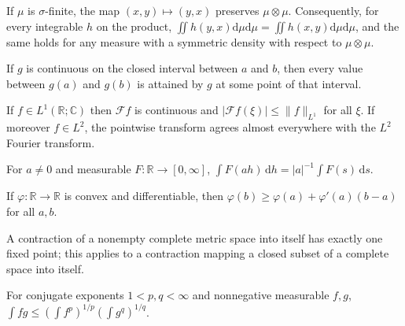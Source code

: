 \begin{theorem}\label{thm:std_product_swap}
\mathlibok
If $\mu$ is $\sigma$-finite, the map $(x, y) \mapsto (y, x)$ preserves $\mu \otimes \mu$. Consequently, for every integrable $h$ on the product, $\iint h(y, x) \mathrm{d}\mu \mathrm{d}\mu = \iint h(x, y) \mathrm{d}\mu \mathrm{d}\mu$, and the same holds for any measure with a symmetric density with respect to $\mu \otimes \mu$.
\end{theorem}

\begin{theorem}\label{thm:std_ivt}
\mathlibok
If $g$ is continuous on the closed interval between $a$ and $b$, then every value between $g(a)$ and $g(b)$ is attained by $g$ at some point of that interval.
\end{theorem}

\begin{theorem}\label{thm:std_fourier_L1}
\mathlibok
If $f \in L^1(\mathbb{R}; \mathbb{C})$ then $\mathcal{F} f$ is continuous and $\lvert \mathcal{F} f(\xi) \rvert \le \lVert f \rVert_{L^1}$ for all $\xi$. If moreover $f \in L^2$, the pointwise transform agrees almost everywhere with the $L^2$ Fourier transform.
\end{theorem}

\begin{theorem}\label{thm:std_line_scaling}
\mathlibok
For $a \ne 0$ and measurable $F : \mathbb{R} \to [0, \infty]$, $\int F(a h)\, \mathrm{d}h = \lvert a \rvert^{-1} \int F(s)\, \mathrm{d}s$.
\end{theorem}

\begin{theorem}\label{thm:std_convex_tangent}
\mathlibok
If $\varphi : \mathbb{R} \to \mathbb{R}$ is convex and differentiable, then $\varphi(b) \ge \varphi(a) + \varphi'(a)(b - a)$ for all $a, b$.
\end{theorem}

\begin{theorem}\label{thm:std_banach}
\mathlibok
A contraction of a nonempty complete metric space into itself has exactly one fixed point; this applies to a contraction mapping a closed subset of a complete space into itself.
\end{theorem}

\begin{theorem}\label{thm:std_holder}
\mathlibok
For conjugate exponents $1 < p, q < \infty$ and nonnegative measurable $f, g$, $\int f g \le (\int f^p)^{1/p} (\int g^q)^{1/q}$.
\end{theorem}


